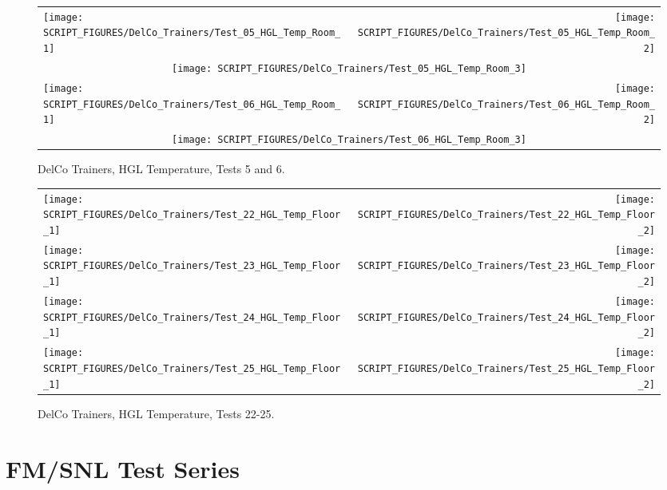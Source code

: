 \begin{figure}[p]
\begin{tabular*}{\textwidth}{l@{\extracolsep{\fill}}r}
\texttt{[image: SCRIPT\_FIGURES/DelCo\_Trainers/Test\_05\_HGL\_Temp\_Room\_1]} &
\texttt{[image: SCRIPT\_FIGURES/DelCo\_Trainers/Test\_05\_HGL\_Temp\_Room\_2]} \\
\multicolumn{2}{c}{\texttt{[image: SCRIPT\_FIGURES/DelCo\_Trainers/Test\_05\_HGL\_Temp\_Room\_3]}} \\
\texttt{[image: SCRIPT\_FIGURES/DelCo\_Trainers/Test\_06\_HGL\_Temp\_Room\_1]} &
\texttt{[image: SCRIPT\_FIGURES/DelCo\_Trainers/Test\_06\_HGL\_Temp\_Room\_2]} \\
\multicolumn{2}{c}{\texttt{[image: SCRIPT\_FIGURES/DelCo\_Trainers/Test\_06\_HGL\_Temp\_Room\_3]}}
\end{tabular*}
\caption[DelCo Trainers, HGL Temperature, Tests 5 and 6]
{DelCo Trainers, HGL Temperature, Tests 5 and 6.}
\label{DelCo_HGL_3}
\end{figure}

\begin{figure}[p]
\begin{tabular*}{\textwidth}{l@{\extracolsep{\fill}}r}
\texttt{[image: SCRIPT\_FIGURES/DelCo\_Trainers/Test\_22\_HGL\_Temp\_Floor\_1]} &
\texttt{[image: SCRIPT\_FIGURES/DelCo\_Trainers/Test\_22\_HGL\_Temp\_Floor\_2]} \\
\texttt{[image: SCRIPT\_FIGURES/DelCo\_Trainers/Test\_23\_HGL\_Temp\_Floor\_1]} &
\texttt{[image: SCRIPT\_FIGURES/DelCo\_Trainers/Test\_23\_HGL\_Temp\_Floor\_2]} \\
\texttt{[image: SCRIPT\_FIGURES/DelCo\_Trainers/Test\_24\_HGL\_Temp\_Floor\_1]} &
\texttt{[image: SCRIPT\_FIGURES/DelCo\_Trainers/Test\_24\_HGL\_Temp\_Floor\_2]} \\
\texttt{[image: SCRIPT\_FIGURES/DelCo\_Trainers/Test\_25\_HGL\_Temp\_Floor\_1]} &
\texttt{[image: SCRIPT\_FIGURES/DelCo\_Trainers/Test\_25\_HGL\_Temp\_Floor\_2]}
\end{tabular*}
\caption[DelCo Trainers, HGL Temperature, Tests 22-25]
{DelCo Trainers, HGL Temperature, Tests 22-25.}
\label{DelCo_HGL_4}
\end{figure}


\clearpage

\section{FM/SNL Test Series}

